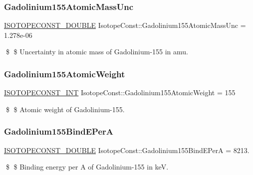 \subsubsection{\texorpdfstring{Gadolinium155\+Atomic\+Mass\+Unc}{Gadolinium155AtomicMassUnc}}
{\footnotesize\ttfamily \mbox{\hyperlink{group___isotope_const-_macros_ga8f45a7272ce02c0b4c65c44636ed719a}{I\+S\+O\+T\+O\+P\+E\+C\+O\+N\+S\+T\+\_\+\+D\+O\+U\+B\+LE}} Isotope\+Const\+::\+Gadolinium155\+Atomic\+Mass\+Unc = 1.\+278e-\/06}

\$ \$ Uncertainty in atomic mass of Gadolinium-\/155 in amu. \mbox{\label{group___isotope_const-_gadolinium-_gd155_gada6574c9cc57a91ba882c83029cdbee4}} 
\subsubsection{\texorpdfstring{Gadolinium155\+Atomic\+Weight}{Gadolinium155AtomicWeight}}
{\footnotesize\ttfamily \mbox{\hyperlink{group___isotope_const-_macros_ga5f18360b3e99483a35c32d789e62621c}{I\+S\+O\+T\+O\+P\+E\+C\+O\+N\+S\+T\+\_\+\+I\+NT}} Isotope\+Const\+::\+Gadolinium155\+Atomic\+Weight = 155}

\$ \$ Atomic weight of Gadolinium-\/155. \mbox{\label{group___isotope_const-_gadolinium-_gd155_gaff2ea4f1fcd5c15ef6fec25eb5a257a8}} 
\subsubsection{\texorpdfstring{Gadolinium155\+Bind\+E\+PerA}{Gadolinium155BindEPerA}}
{\footnotesize\ttfamily \mbox{\hyperlink{group___isotope_const-_macros_ga8f45a7272ce02c0b4c65c44636ed719a}{I\+S\+O\+T\+O\+P\+E\+C\+O\+N\+S\+T\+\_\+\+D\+O\+U\+B\+LE}} Isotope\+Const\+::\+Gadolinium155\+Bind\+E\+PerA = 8213.}

\$ \$ Binding energy per A of Gadolinium-\/155 in keV. \mbox{\label{group___isotope_const-_gadolinium-_gd155_gae8643c14eb9306e849007710dbbfdc87}} 
